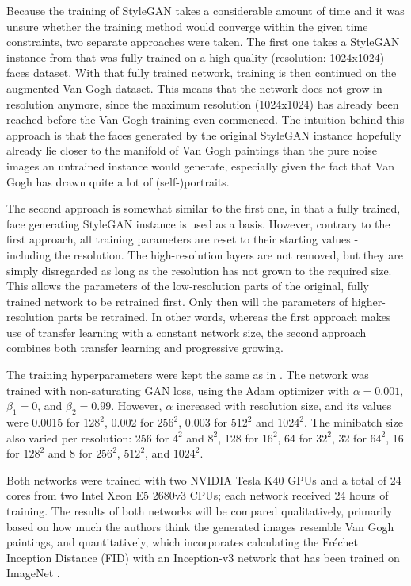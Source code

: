 \documentclass{article}
\begin{document}
Because the training of StyleGAN takes a considerable amount of time and it was unsure whether the training method would converge within the given time constraints, two separate approaches were taken. The first one takes a StyleGAN instance from \cite{karras2019stylebased} that was fully trained on a high-quality (resolution: 1024x1024) faces dataset. With that fully trained network, training is then continued on the augmented Van Gogh dataset. This means that the network does not grow in resolution anymore, since the maximum resolution (1024x1024) has already been reached before the Van Gogh training even commenced. The intuition behind this approach is that the faces generated by the original StyleGAN instance hopefully already lie closer to the manifold of Van Gogh paintings than the pure noise images an untrained instance would generate, especially given the fact that Van Gogh has drawn quite a lot of (self-)portraits.

The second approach is somewhat similar to the first one, in that a fully trained, face generating StyleGAN instance is used as a basis. However, contrary to the first approach, all training parameters are reset to their starting values - including the resolution. The high-resolution layers are not removed, but they are simply disregarded as long as the resolution has not grown to the required size. This allows the parameters of the low-resolution parts of the original, fully trained network to be retrained first. Only then will the parameters of higher-resolution parts be retrained. In other words, whereas the first approach makes use of transfer learning with a constant network size, the second approach combines both transfer learning and progressive growing.

The training hyperparameters were kept the same as in \cite{karras2019stylebased}. The network was trained with non-saturating GAN loss, using the Adam optimizer \cite{kingma2017adam} with $\alpha = 0.001$, $\beta_1 = 0$, and $\beta_2 = 0.99$. However, $\alpha$ increased with resolution size, and its values were 0.0015 for $128^2$, 0.002 for $256^2$, 0.003 for $512^2$ and $1024^2$. The minibatch size also varied per resolution: 256 for $4^2$ and $8^2$, 128 for $16^2$, 64 for $32^2$, 32 for $64^2$, 16 for $128^2$ and 8 for $256^2$, $512^2$, and $1024^2$.

Both networks were trained with two NVIDIA Tesla K40 GPUs and a total of 24 cores from two Intel Xeon E5 2680v3 CPUs; each network received 24 hours of training. The results of both networks will be compared qualitatively, primarily based on how much the authors think the generated images resemble Van Gogh paintings, and quantitatively, which incorporates calculating the Fréchet Inception Distance (FID) \cite{heusel2017frechet} with an Inception-v3 network \cite{szegedy2016inception} that has been trained on ImageNet \cite{imagenet2009}.
\end{document}
